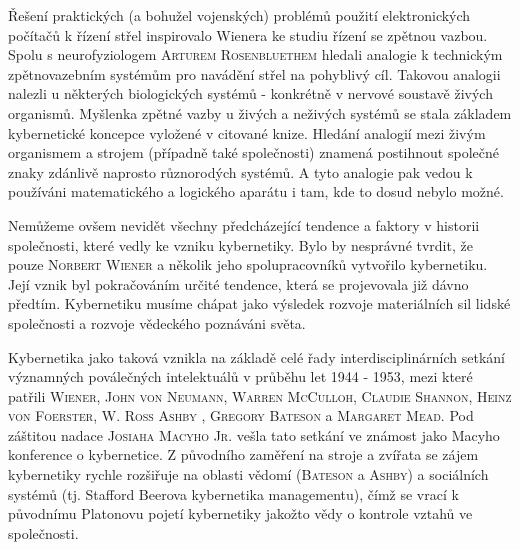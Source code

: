     
    Řešení praktických (a bohužel vojenských) problémů použití elektronických počítačů k řízení
    střel inspirovalo Wienera ke studiu řízení se zpětnou vazbou. Spolu s neurofyziologem
    \textsc{Arturem Rosenbluethem} hledali analogie k technickým zpětnovazebním systémům pro
    navádění střel na pohyblivý cíl. Takovou analogii nalezli u některých biologických systémů -
    konkrétně v nervové soustavě živých organismů. Myšlenka zpětné vazby u živých a neživých systémů
    se stala základem kybernetické koncepce vyložené v citované knize. Hledání analogií mezi živým
    organismem a strojem (případně také společnosti) znamená postihnout společné znaky zdánlivě
    naprosto různorodých systémů. A tyto analogie pak vedou k používáni matematického a logického
    aparátu i tam, kde to dosud nebylo možné.
    
    Nemůžeme ovšem nevidět všechny předcházející tendence a faktory v historii společnosti, které
    vedly ke vzniku kybernetiky. Bylo by nesprávné tvrdit, že pouze \textsc{Norbert Wiener} a
    několik jeho spolupracovníků vytvořilo kybernetiku. Její vznik byl pokračováním určité tendence,
    která se projevovala již dávno předtím. Kybernetiku musíme chápat jako výsledek rozvoje
    materiálních sil lidské společnosti a rozvoje vědeckého poznáváni světa.
    
    Kybernetika jako taková vznikla na základě celé řady interdisciplinárních setkání významných
    poválečných intelektuálů v průběhu let 1944 - 1953, mezi které patřili \textsc{Wiener},
    \textsc{John von Neumann}, \textsc{Warren McCulloh}, \textsc{Claudie Shannon}, \textsc{Heinz von
    Foerster}, \textsc{W. Ross Ashby} \cite{Ashby1956}, \textsc{Gregory Bateson} a \textsc{Margaret
    Mead}. Pod záštitou nadace \textsc{Josiaha Macyho Jr.} vešla tato setkání ve známost jako Macyho
    konference o kybernetice. Z původního zaměření na stroje a zvířata se zájem kybernetiky rychle
    rozšiřuje na oblasti vědomí (\textsc{Bateson} a \textsc{Ashby}) a sociálních systémů (tj.
    Stafford Beerova kybernetika managementu), čímž se vrací k původnímu Platonovu pojetí
    kybernetiky jakožto vědy o kontrole vztahů ve společnosti. 
    
